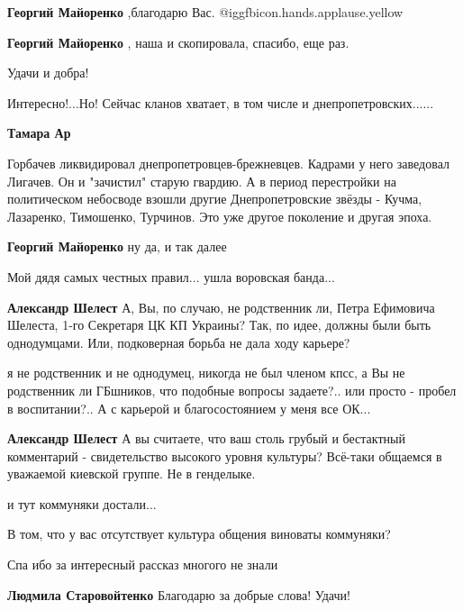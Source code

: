 \begin{itemize}
\begin{itemize}
\textbf{Георгий Майоренко} ,благодарю Вас. @igg{fbicon.hands.applause.yellow} 

\textbf{Георгий Майоренко} , наша и скопировала, спасибо, еще раз.

Удачи и добра!
\end{itemize} %

Интересно!...Но! Сейчас кланов хватает, в том числе и днепропетровских......

\begin{itemize} %
\textbf{Тамара Ар} 

Горбачев ликвидировал днепропетровцев-брежневцев. Кадрами у него заведовал
Лигачев. Он и "зачистил" старую гвардию. А в период перестройки на политическом
небосводе взошли другие Днепропетровские звёзды - Кучма, Лазаренко, Тимошенко,
Турчинов. Это уже другое поколение и другая эпоха.

\textbf{Георгий Майоренко} ну да, и так далее
\end{itemize} %

Мой дядя самых честных правил... ушла воровская банда...

\begin{itemize} %
\textbf{Александр Шелест} А, Вы, по случаю, не родственник ли, Петра Ефимовича Шелеста, 1-го Секретаря ЦК КП Украины? Так, по идее, должны были быть однодумцами. Или, подковерная борьба не дала ходу карьере?

я не родственник и не однодумец, никогда не был членом кпсс, а Вы не родственник ли ГБшников, что подобные вопросы задаете?.. или просто - пробел в воспитании?.. А с карьерой и благосостоянием у меня все ОК...

\textbf{Александр Шелест} А вы считаете, что ваш столь грубый и бестактный комментарий - свидетельство высокого уровня культуры? Всё-таки общаемся в уважаемой киевской группе. Не в генделыке.

и тут коммуняки достали...

В том, что у вас отсутствует культура общения виноваты коммуняки?
\end{itemize} %

Спа ибо за интересный рассказ многого не знали

\begin{itemize} %
\textbf{Людмила Старовойтенко} Благодарю за добрые слова! Удачи!
\end{itemize} %


\end{itemize}
